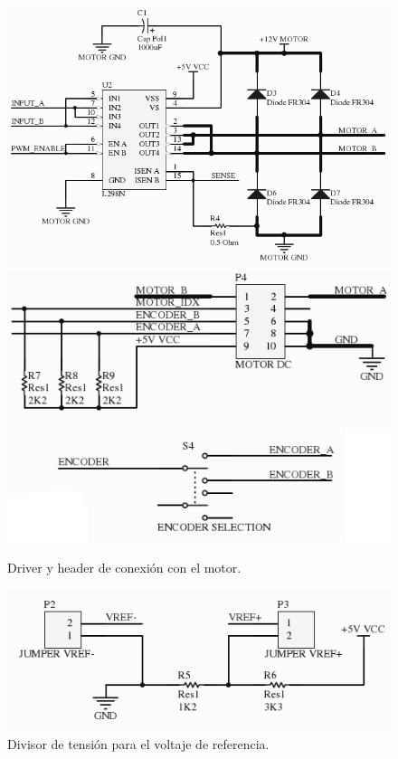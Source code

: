 \begin{figure}
	\centering
	\includegraphics[scale=.3]{figuras/dc_schemaDriver.png}
	\includegraphics[scale=.3]{figuras/dc_schemaMotorEncoder.png}
	\caption{Driver y header de conexi\'on con el motor.}
	\label{hF_placa_dc_schema3}
\end{figure}

\begin{figure}
	\centering
	\includegraphics[scale=.3]{figuras/dc_schemaADC.png}
	\caption{Divisor de tensi\'on para el voltaje de referencia.}
	\label{hF_placa_dc_schema4}
\end{figure}

